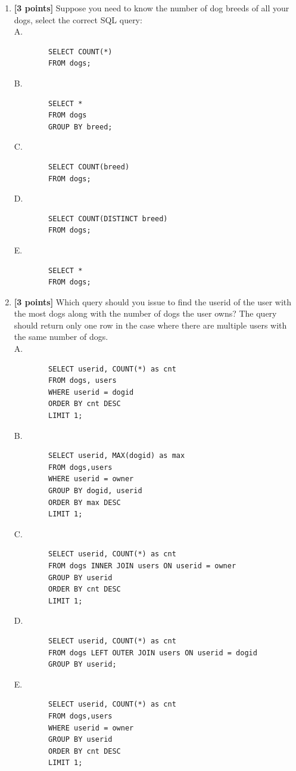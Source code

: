\documentclass[10pt]{article}
\begin{document}
\begin{enumerate}
	\item \textbf{[3 points]}
	      Suppose you need to know the number of dog breeds of all your dogs, select the correct SQL query:\\
	      A.
	      \begin{lstlisting} 
		SELECT COUNT(*) 
		FROM dogs;
	\end{lstlisting}
	      B.
	      \begin{lstlisting}
		SELECT * 
		FROM dogs 
		GROUP BY breed;
	\end{lstlisting}
	      C.
	      \begin{lstlisting}
		SELECT COUNT(breed) 
		FROM dogs;
	\end{lstlisting}
	      D.
	      \begin{lstlisting}
		SELECT COUNT(DISTINCT breed) 
		FROM dogs;
	\end{lstlisting}
	      E.
	      \begin{lstlisting}
		SELECT * 
		FROM dogs;
	\end{lstlisting}

	\item \textbf{[3 points]}
	      Which query	should you issue to find the userid of the user with the most dogs along with the number of dogs the user owns?
	      The query should return only one row in the case where there are multiple users	with the same number of dogs. \\
	      A.
	      \begin{lstlisting}
        SELECT userid, COUNT(*) as cnt
        FROM dogs, users
        WHERE userid = dogid
        ORDER BY cnt DESC
        LIMIT 1;
    \end{lstlisting}
	      B.
	      \begin{lstlisting}
        SELECT userid, MAX(dogid) as max
        FROM dogs,users
        WHERE userid = owner
        GROUP BY dogid, userid
        ORDER BY max DESC
        LIMIT 1;
    \end{lstlisting}
	      C.
	      \begin{lstlisting}
        SELECT userid, COUNT(*) as cnt
        FROM dogs INNER JOIN users ON userid = owner
        GROUP BY userid
        ORDER BY cnt DESC
        LIMIT 1;
    \end{lstlisting}
	      D.
	      \begin{lstlisting}
        SELECT userid, COUNT(*) as cnt
        FROM dogs LEFT OUTER JOIN users ON userid = dogid
        GROUP BY userid;
    \end{lstlisting}
	      E.
	      \begin{lstlisting}
        SELECT userid, COUNT(*) as cnt
        FROM dogs,users
        WHERE userid = owner
        GROUP BY userid
        ORDER BY cnt DESC
        LIMIT 1;
    \end{lstlisting}


\end{enumerate}
\end{document}

